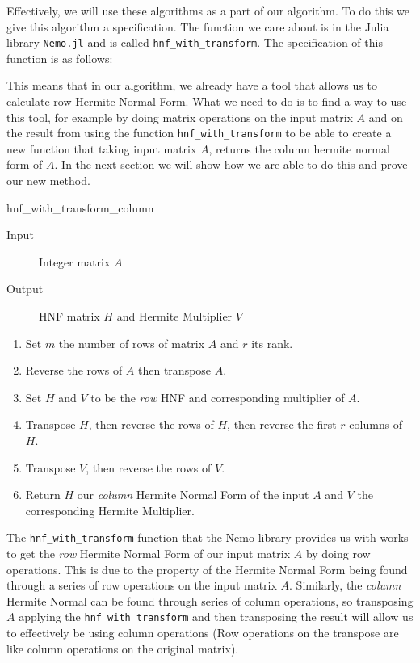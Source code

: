 \documentclass[oneside, a4paper, onecolumn, 11pt]{article}
\begin{document}
Effectively, we will use these algorithms as a part of our algorithm. To do this we give this algorithm a specification. The function we care about is in the Julia library \texttt{Nemo.jl} \cite{nemo} and is called \texttt{hnf\_with\_transform}. The specification of this function is as follows:

This means that in our algorithm, we already have a tool that allows us to calculate row Hermite Normal Form. What we need to do is to find a way to use this tool, for example by doing matrix operations on the input matrix \(A\) and on the result from using the function \texttt{hnf\_with\_transform} to be able to create a new function that taking input matrix \(A\), returns the column hermite normal form of \(A\). In the next section we will show how we are able to do this and prove our new method.

\begin{algorithm}[H]
    \caption{hnf\_with\_transform\_column}

    \begin{description}
        \item[Input] Integer matrix \(A\)
        \item[Output] HNF matrix \(H\) and Hermite Multiplier \(V\)
    \end{description}

    \begin{enumerate}[label = \textbf{(Step~\arabic*)}, leftmargin=*, align=left, labelsep=2pt, itemsep=0pt]
        \item Set \(m\) the number of rows of matrix \(A\) and \(r\) its rank.
        \item Reverse the rows of \(A\) then transpose \(A\).
        \item Set \(H\) and \(V\) to be the \textit{row} HNF and corresponding multiplier of \(A\).
        \item Transpose \(H\), then reverse the rows of \(H\), then reverse the first \(r\) columns of \(H\).
        \item Transpose \(V\), then reverse the rows of \(V\).
        \item Return \(H\) our \textit{column} Hermite Normal Form of the input \(A\) and \(V\) the corresponding Hermite Multiplier.
    \end{enumerate}
\end{algorithm}

The \texttt{hnf\_with\_transform} function that the Nemo library provides us with works to get the \textit{row} Hermite Normal Form of our input matrix \(A\) by doing row operations. This is due to the property of the Hermite Normal Form being found through a series of row operations on the input matrix \(A\). Similarly, the \textit{column} Hermite Normal can be found through series of column operations, so transposing \(A\) applying the \texttt{hnf\_with\_transform} and then transposing the result will allow us to effectively be using column operations (Row operations on the transpose are like column operations on the original matrix).
\end{document}
